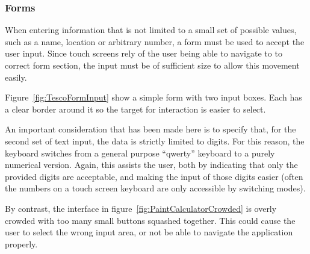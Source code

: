 
\subsubsection{Forms}
\label{ssub:forms}


When entering information that is not limited to a small set of possible
values, such as a name, location or arbitrary number, a form must be used to
accept the user input. Since touch screens rely of the user being able to
navigate to to correct form section, the input must be of sufficient size to
allow this movement easily.

Figure~\ref{fig:TescoFormInput} show a simple form with two input boxes. Each
has a clear border around it so the target for interaction is easier to select.


An important consideration that has been made here is to specify that, for the
second set of text input, the data is strictly limited to digits. For this
reason, the keyboard switches from a general purpose ``qwerty'' keyboard to a
purely numerical version. Again, this assists the user, both by indicating that
only the provided digits are acceptable, and making the input of those digits
easier (often the numbers on a touch screen keyboard are only accessible by
switching modes).

By contrast, the interface in figure~\ref{fig:PaintCalculatorCrowded} is overly
crowded with too many small buttons squashed together. This could cause the
user to select the wrong input area, or not be able to navigate the application
properly.

